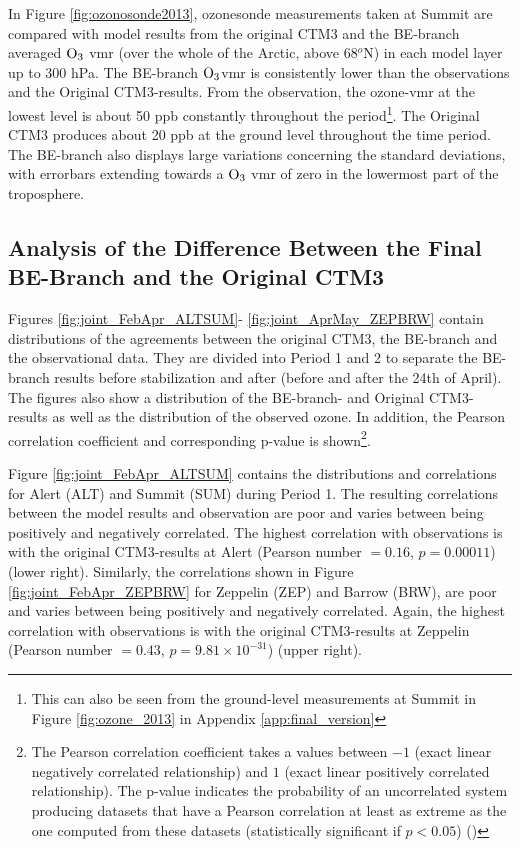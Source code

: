 \medskip

In Figure \ref{fig:ozonosonde2013}, ozonesonde measurements taken at Summit are compared with model results from the original CTM3 and the BE-branch averaged $\mathrm{O_3}$ \acrshort{vmr} (over the whole of the Arctic, above 68$^o$N) in each model layer up to 300 hPa. The BE-branch $\mathrm{O_3}$\acrshort{vmr} is consistently lower than the observations and the Original CTM3-results. From the observation, the ozone-\acrshort{vmr} at the lowest level is about 50 ppb constantly throughout the period\footnote{This can also be seen from the ground-level measurements at Summit in Figure \ref{fig:ozone_2013} in Appendix \ref{app:final_version}}. The Original CTM3 produces about 20 ppb at the ground level throughout the time period. The BE-branch also displays large variations concerning the standard deviations, with errorbars extending towards a $\mathrm{O_3}$ \acrshort{vmr} of zero in the lowermost part of the troposphere. 




\clearpage



\subsection{Analysis of the Difference Between the Final BE-Branch and the Original CTM3}\label{sec:res_origBE} 

Figures \ref{fig:joint_FebApr_ALTSUM}- \ref{fig:joint_AprMay_ZEPBRW} contain distributions of the agreements between the original CTM3, the BE-branch and the observational data. They are divided into Period 1 and 2 to separate the BE-branch results before stabilization and after (before and after the 24th of April). The figures also show a distribution of the BE-branch- and Original CTM3-results as well as the distribution of the observed ozone. In addition, the Pearson correlation coefficient and corresponding p-value is shown\footnote{The Pearson correlation coefficient takes a values between $-1$ (exact linear negatively correlated relationship) and $1$ (exact linear positively correlated relationship). The p-value indicates the probability of an uncorrelated system producing datasets that have a Pearson correlation at least as extreme as the one computed from these datasets (statistically significant if $p<0.05$) (\cite{WILKS201123})}.

\medskip

Figure \ref{fig:joint_FebApr_ALTSUM} contains the distributions and correlations for Alert (ALT) and Summit (SUM) during Period 1. The resulting correlations between the model results and observation are poor and varies between being positively and negatively correlated. The highest correlation with observations is with the original CTM3-results at Alert (Pearson number $=0.16$, $p = 0.00011$) (lower right). Similarly, the correlations shown in Figure \ref{fig:joint_FebApr_ZEPBRW} for Zeppelin (ZEP) and Barrow (BRW), are poor and varies between being positively and negatively correlated. Again, the highest correlation with observations is with the original CTM3-results at Zeppelin (Pearson number $=0.43$, $p = 9.81\times10^{-31}$) (upper right). 

